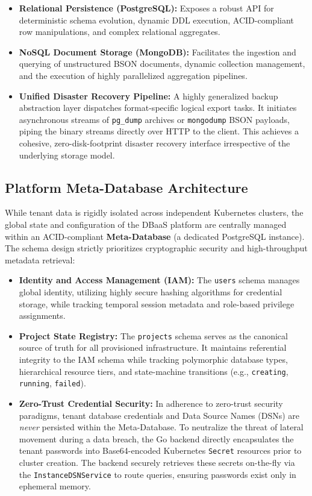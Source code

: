 \begin{itemize}
    \item \textbf{Relational Persistence (PostgreSQL):} Exposes a robust API for deterministic schema evolution, dynamic DDL execution, ACID-compliant row manipulations, and complex relational aggregates.
    \item \textbf{NoSQL Document Storage (MongoDB):} Facilitates the ingestion and querying of unstructured BSON documents, dynamic collection management, and the execution of highly parallelized aggregation pipelines.
    \item \textbf{Unified Disaster Recovery Pipeline:} A highly generalized backup abstraction layer dispatches format-specific logical export tasks. It initiates asynchronous streams of \texttt{pg\_dump} archives or \texttt{mongodump} BSON payloads, piping the binary streams directly over HTTP to the client. This achieves a cohesive, zero-disk-footprint disaster recovery interface irrespective of the underlying storage model.
\end{itemize}

\subsection{Platform Meta-Database Architecture}

While tenant data is rigidly isolated across independent Kubernetes clusters, the global state and configuration of the DBaaS platform are centrally managed within an ACID-compliant \textbf{Meta-Database} (a dedicated PostgreSQL instance). The schema design strictly prioritizes cryptographic security and high-throughput metadata retrieval:

\begin{itemize}
    \item \textbf{Identity and Access Management (IAM):} The \texttt{users} schema manages global identity, utilizing highly secure hashing algorithms for credential storage, while tracking temporal session metadata and role-based privilege assignments.
    \item \textbf{Project State Registry:} The \texttt{projects} schema serves as the canonical source of truth for all provisioned infrastructure. It maintains referential integrity to the IAM schema while tracking polymorphic database types, hierarchical resource tiers, and state-machine transitions (e.g., \texttt{creating}, \texttt{running}, \texttt{failed}).
    \item \textbf{Zero-Trust Credential Security:} In adherence to zero-trust security paradigms, tenant database credentials and Data Source Names (DSNs) are \textit{never} persisted within the Meta-Database. To neutralize the threat of lateral movement during a data breach, the Go backend directly encapsulates the tenant passwords into Base64-encoded Kubernetes \texttt{Secret} resources prior to cluster creation. The backend securely retrieves these secrets on-the-fly via the \texttt{InstanceDSNService} to route queries, ensuring passwords exist only in ephemeral memory.
\end{itemize}

